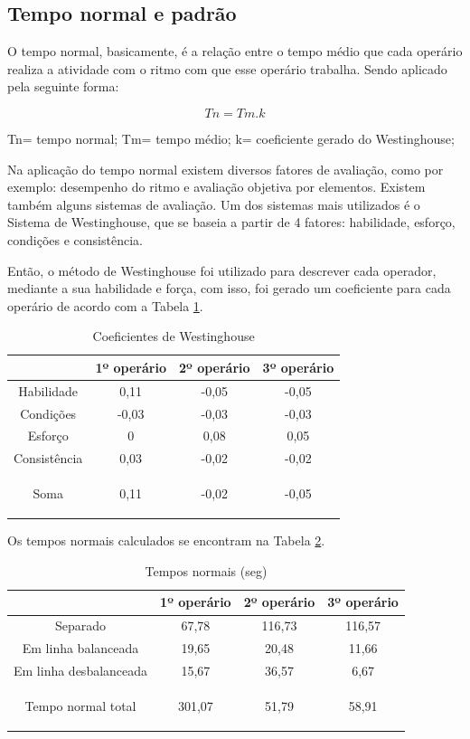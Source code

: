 \documentclass[
	12pt,				%
	oneside,			%
	a4paper,			%
	english,			%
	french,				%
	spanish,			%
	brazil,				%
	]{abntex2}
\begin{document}
\subsection{Tempo normal e padrão}

O tempo normal, basicamente, é a relação entre o tempo médio que cada operário realiza a atividade com o ritmo com que esse operário trabalha. Sendo aplicado pela seguinte forma:

\begin{equation}
Tn=Tm.k
\end{equation}

Tn= tempo normal; Tm= tempo médio; k= coeficiente gerado do Westinghouse;

	Na aplicação do tempo normal existem diversos fatores de avaliação, como por exemplo: desempenho do ritmo e avaliação objetiva por elementos. Existem também alguns sistemas de avaliação. Um dos sistemas mais utilizados é o Sistema de Westinghouse, que se baseia a partir de 4 fatores: habilidade, esforço, condições e consistência.
	
	Então, o método de Westinghouse foi utilizado para descrever cada operador, mediante a sua habilidade e força, com isso, foi gerado um coeficiente para cada operário de acordo com a Tabela \ref{tab2}.
	
\begin{table}[H]
\centering
\caption{Coeficientes de Westinghouse}
\begin{tabular}{c|c|c|c}


	& 1º operário	&		2º operário		&	3º operário		\\ \hline
Habilidade &	0,11	&		-0,05	&		-0,05		\\ \hline
Condições &	-0,03	&		-0,03	&		-0,03		\\ \hline
Esforço &	0	&		0,08	&		0,05		\\ \hline
Consistência &	0,03	&		-0,02	&		-0,02		\\ \hline
Soma &	0,11	&		-0,02	&		-0,05	
	
\label{tab2}
\end{tabular}	
\end{table}

Os tempos normais calculados se encontram na Tabela \ref{tab8}.

\begin{table}[H]
\centering
\caption{Tempos normais (seg)}
\begin{tabular}{c|c|c|c}


	&1º operário&			2º operário	&		3º operário		\\ \hline
Separado&	67,78	&		116,73		&	116,57		\\ \hline
Em linha balanceada&	19,65	&		20,48	&		11,66	\\ \hline	
Em linha desbalanceada&	15,67	&		36,57		&	6,67		\\ \hline
Tempo normal total&	301,07	&		51,79		&	58,91		
													
\label{tab8}
\end{tabular}	
\end{table}				
							
\end{document}
